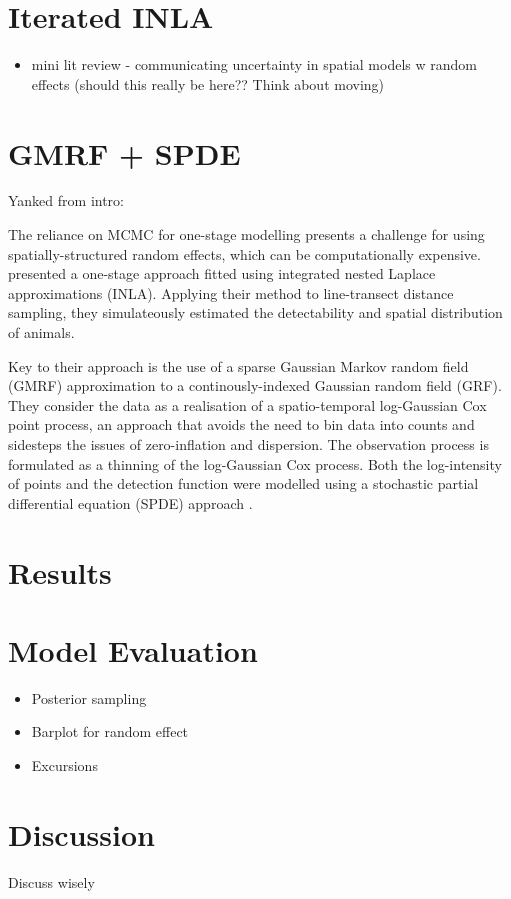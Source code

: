 \documentclass[preprint,12pt]{elsarticle}
\begin{document}
\section{Iterated INLA}

\begin{itemize}
	\item mini lit review - communicating uncertainty in spatial models w random effects
	(should this really be here??  Think about moving)
\end{itemize}

\section{GMRF + SPDE}

Yanked from intro:

The reliance on MCMC for one-stage modelling presents a challenge for using spatially-structured random effects, which can be computationally expensive.  \citet{yuan_point_2017} presented a one-stage approach fitted using integrated nested Laplace approximations (INLA).  Applying their method to line-transect distance sampling, they simulateously estimated the detectability and spatial distribution of animals.

Key to their approach is the use of a sparse Gaussian Markov random field (GMRF) approximation to a continously-indexed Gaussian random field (GRF).  They consider the data as a realisation of a spatio-temporal log-Gaussian Cox point process, an approach that avoids the need to bin data into counts and sidesteps the issues of zero-inflation and dispersion.  The observation process is formulated as a thinning of the log-Gaussian Cox process.  Both the log-intensity of points and the detection function were modelled using a stochastic partial differential equation (SPDE) approach \citep{lindgren_explicit_2011}.

\section{Results}

\section{Model Evaluation}

\begin{itemize}
	\item Posterior sampling
	\item Barplot for random effect
	\item Excursions
\end{itemize}

\section{Discussion}

Discuss wisely



\end{document}
